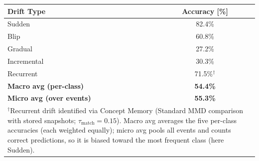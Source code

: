 \begin{tabular}{|l|c|}
\hline
\textbf{Drift Type} & \textbf{Accuracy [\%]} \\
\hline
Sudden & 82.4\% \\
Blip & 60.8\% \\
Gradual & 27.2\% \\
Incremental & 30.3\% \\
Recurrent & 71.5\%$^\dagger$ \\
\hline
\textbf{Macro avg (per-class)} & \textbf{54.4\%} \\
\textbf{Micro avg (over events)} & \textbf{55.3\%} \\
\hline
\multicolumn{2}{|p{0.85\textwidth}|}{\footnotesize $^\dagger$Recurrent drift identified via Concept Memory (Standard MMD comparison with stored snapshots; $\tau_{\text{match}}=0.15$). Macro avg averages the five per-class accuracies (each weighted equally); micro avg pools all events and counts correct predictions, so it is biased toward the most frequent class (here Sudden).}\\
\hline
\end{tabular}